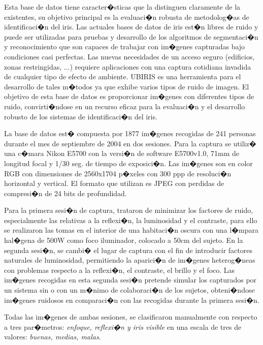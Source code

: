  \label{sec:UBIRIS_database}

Esta base de datos tiene caracter�sticas que la distinguen claramente de la existentes, su objetivo principal es la evaluaci�n robusta de metodolog�as de identificaci�n del iris. Las actuales bases de datos de iris est�n libres de ruido y puede ser utilizadas para pruebas y desarrollo de los algoritmos de segmentaci�n y reconocimiento que son capaces de trabajar con im�genes capturadas bajo condiciones casi perfectas. Las nuevas necesidades de un acceso seguro (edificios, zonas restringidas, ...) requiere aplicaciones con una captura cotidiana invadida de cualquier tipo de efecto de ambiente. UBIRIS es una herramienta para el desarrollo de tales m�todos ya que exhibe varios tipos de ruido de imagen. El objetivo de esta base de datos es proporcionar im�genes con diferentes tipos de ruido, convirti�ndose en un recurso eficaz para la evaluaci�n y el desarrollo robusto de los sistemas de identificaci�n del iris.

La base de datos est� compuesta por 1877 im�genes recogidas de 241 personas durante el mes de septiembre de 2004 en dos sesiones. Para la captura se utiliz� una c�mara Nikon E5700 con la versi�n de software E5700v1.0, 71mm de longitud focal y 1/30 seg. de tiempo de exposici�n. Las im�genes son en color RGB con dimensiones de 2560x1704 p�xeles con 300 ppp de resoluci�n horizontal y vertical. El formato que utilizan es JPEG con perdidas de compresi�n de 24 bits de profundidad.

Para la primera sesi�n de captura, trataron de minimizar los factores de ruido, especialmente las relativas a la reflexi�n, la luminosidad y el contraste, para ello se realizaron las tomas en el interior de una habitaci�n oscura con una l�mpara hal�gena de 500W como foco iluminador, colocado a 50cm del sujeto. En la segunda sesi�n, se cambi� el lugar de captura con el fin de introducir factores naturales de luminosidad, permitiendo la aparici�n de im�genes heterog�neas con problemas respecto a la reflexi�n, el contraste, el brillo y el foco. Las im�genes recogidas en esta segunda sesi�n pretende simular los capturados por un sistema sin o con un m�nimo de colaboraci�n de los sujetos, obteni�ndose im�genes ruidosos en comparaci�n con las recogidas durante la primera sesi�n.

Todas las im�genes de ambas sesiones, se clasificaron manualmente con respecto a tres par�metros: \emph{enfoque, reflexi�n y iris visible} en una escala de tres de valores: \emph{buenas, medias, malas}.

